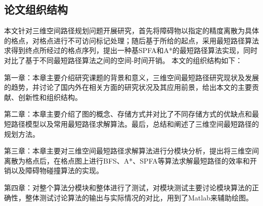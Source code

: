 \subsection{论文组织结构}
\par 本文针对三维空间路径规划问题开展研究，首先将障碍物以指定的精度离散为具体的格点，对格点进行不可访问标记处理；随后基于所给的起点，采用最短路径算法求得到终点所经过的格点序列，提出一种基SPFA和A*的最短路径算法实现，同时对比了基于不同最短路径算法之间的空间-时间开销。
本文的组织结构如下：
\par 第一章：本章主要介绍研究课题的背景和意义，三维空间最短路径研究现状及发展的趋势，并讨论了国内外在相关方面的研究状况及其应用前景，给出本文的主要贡献、创新性和组织结构。
\par 第二章：本章主要介绍了图的概念、存储方式并对比了不同存储方式的优缺点和最短路径模型以及常用最短路径求解算法。最后，总结和阐述了三维空间最短路径的规划方法。
\par 第三章：本章主要对三维空间最短路径求解算法进行分模块分析，提出将三维空间离散为格点后，在格点图上进行BFS、A*、SPFA等算法求解最短路径的效率和开销以及障碍物碰撞算法的实现。
\par 第四章：对整个算法分模块和整体进行了测试，对模块测试主要讨论模块算法的正确性，整体测试讨论算法的输出与实际情况的对比，用到了Matlab来辅助绘图。